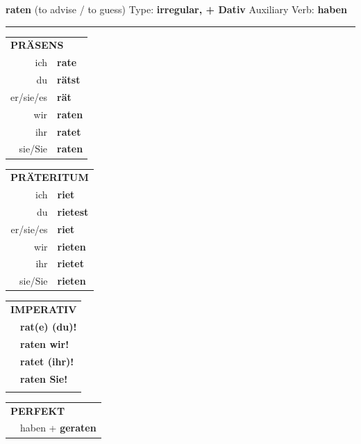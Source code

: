 \documentclass[10pt,a4paper]{revtex4-2}
\begin{document}
\begin{verbbox-dat}
    {\Large \bf raten} (to advise / to guess) \hfill Type: \textbf{irregular, + Dativ} \hfill Auxiliary Verb: \textbf{haben} 
    
     \vspace{5pt}

    \hrule
    
    \vspace{5pt}

  \begin{tabular}{rl}
     \multicolumn{2}{l}{\textbf{PRÄSENS} }\\
    ich & \textbf{rate}\\
    du & \textbf{rätst}\\
    er/sie/es & \textbf{rät}\\
    wir & \textbf{raten}\\
    ihr & \textbf{ratet}\\
    sie/Sie & \textbf{raten}\\
  \end{tabular}
  \hfill
     \begin{tabular}{rl}
    \multicolumn{2}{l}{\textbf{PRÄTERITUM} }\\
    ich & \textbf{riet}\\
    du & \textbf{rietest}\\
    er/sie/es & \textbf{riet}\\
    wir & \textbf{rieten}\\
    ihr & \textbf{rietet}\\
    sie/Sie & \textbf{rieten}\\
  \end{tabular}
  \hfill
  \begin{tabular}{rl}
     \multicolumn{2}{l}{\textbf{IMPERATIV} }\\
   & \textbf{rat(e) (du)!}\\
   & \textbf{raten wir!}\\
   & \textbf{ratet (ihr)!}\\
   & \textbf{raten Sie!}\\
   & \vspace{10pt}
  \end{tabular}

    \vspace{10pt}

 \begin{tabular}{rl}
     \multicolumn{2}{l}{\textbf{PERFEKT}}\\
   & haben + \textbf{geraten}\\
  \end{tabular}
\hfill
   \begin{tabular}{rl}
   

\end{tabular}
\end{verbbox-dat}
\end{document}
